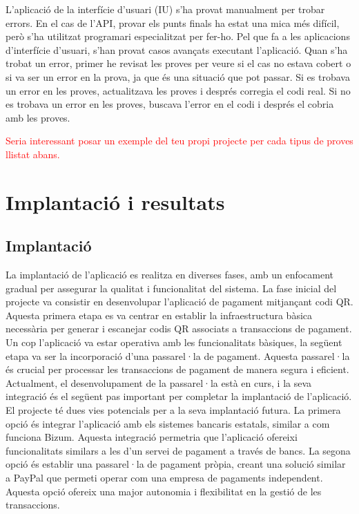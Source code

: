 \documentclass[a4paper,12pt,twoside]{ThesisStyle}
\newcommand{\pau}[1]{\textcolor{red}{#1}}
\begin{document}
L'aplicació de la interfície d'usuari (IU) s'ha provat manualment per trobar errors. En el cas de l'API, provar els punts finals ha estat una mica més difícil, però s'ha utilitzat programari especialitzat per fer-ho. Pel que fa a les aplicacions d'interfície d'usuari, s'han provat casos avançats executant l'aplicació. Quan s'ha trobat un error, primer he revisat les proves per veure si el cas no estava cobert o si va ser un error en la prova, ja que és una situació que pot passar. Si es trobava un error en les proves, actualitzava les proves i després corregia el codi real. Si no es trobava un error en les proves, buscava l'error en el codi i després el cobria amb les proves.

\pau{Seria interessant posar un exemple del teu propi projecte per cada tipus de proves llistat abans.}




\chapter{Implantació i resultats}
\label{chp:implantacio}


\section{Implantació}
\label{sec: Implantació}

La implantació de l'aplicació es realitza en diverses fases, amb un enfocament gradual per assegurar la qualitat i funcionalitat del sistema. La fase inicial del projecte va consistir en desenvolupar l'aplicació de pagament mitjançant codi QR. Aquesta primera etapa es va centrar en establir la infraestructura bàsica necessària per generar i escanejar codis QR associats a transaccions de pagament.\\

Un cop l'aplicació va estar operativa amb les funcionalitats bàsiques, la següent etapa va ser la incorporació d'una passarel·la de pagament. Aquesta passarel·la és crucial per processar les transaccions de pagament de manera segura i eficient. Actualment, el desenvolupament de la passarel·la està en curs, i la seva integració és el següent pas important per completar la implantació de l'aplicació.\\

El projecte té dues vies potencials per a la seva implantació futura. La primera opció és integrar l'aplicació amb els sistemes bancaris estatals, similar a com funciona Bizum. Aquesta integració permetria que l'aplicació ofereixi funcionalitats similars a les d'un servei de pagament a través de bancs. La segona opció és establir una passarel·la de pagament pròpia, creant una solució similar a PayPal que permeti operar com una empresa de pagaments independent. Aquesta opció ofereix una major autonomia i flexibilitat en la gestió de les transaccions.
\end{document}
